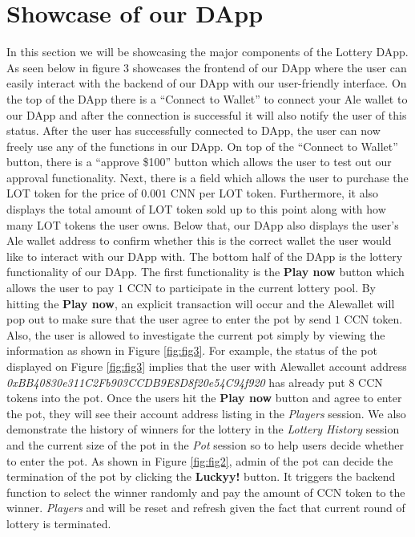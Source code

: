 \documentclass[11pt]{article}
\newcommand {\rfig}[1]{Figure \ref{fig:#1}}
\begin{document}
\section*{Showcase of our DApp}
In this section we will be showcasing the major components of the Lottery DApp. As seen below in figure 3 showcases the frontend of our DApp where the user can easily interact with the backend of our DApp with our user-friendly interface. On the top of the DApp there is a “Connect to Wallet” to connect your Ale wallet to our DApp and after the connection is successful it will also notify the user of this status. After the user has successfully connected to DApp, the user can now freely use any of the functions in our DApp. On top of the “Connect to Wallet” button, there is a “approve \$100” button which allows the user to test out our approval functionality. Next, there is a field which allows the user to purchase the LOT token for the price of $0.001$ CNN per LOT token. Furthermore, it also displays the total amount of LOT token sold up to this point along with how many LOT tokens the user owns. Below that, our DApp also displays the user’s Ale wallet address to confirm whether this is the correct wallet the user would like to interact with our DApp with. The bottom half of the DApp is the lottery functionality of our DApp. The first functionality is the \textbf{Play now} button which allows the user to pay $1$ CCN to participate in the current lottery pool. By hitting the \textbf{Play now}, an explicit transaction will occur and the Alewallet will pop out to make sure that the user agree to enter the pot by send $1$ CCN token. Also, the user is allowed to investigate the current pot simply by viewing the information as shown in \rfig{fig3}. For example, the status of the pot displayed on \rfig{fig3} implies that the user with Alewallet account address \textit{0xBB40830e311C2Fb903CCDB9E8D8f20e54C94f920} has already put 8 CCN tokens into the pot. Once the users hit the \textbf{Play now} button and agree to enter the pot, they will see their account address listing in the \textit{Players} session. We also demonstrate the history of winners for the lottery in the \textit{Lottery History} session and the current size of the pot in the \textit{Pot} session so to help users decide whether to enter the pot. As shown in \rfig{fig2}, admin of the pot can decide the termination of the pot by clicking the \textbf{Luckyy!} button. It triggers the backend function to select the winner randomly and pay the amount of CCN token to the winner. \textit{Players} and  will be reset and refresh given the fact that current round of lottery is terminated. \\
\end{document}
